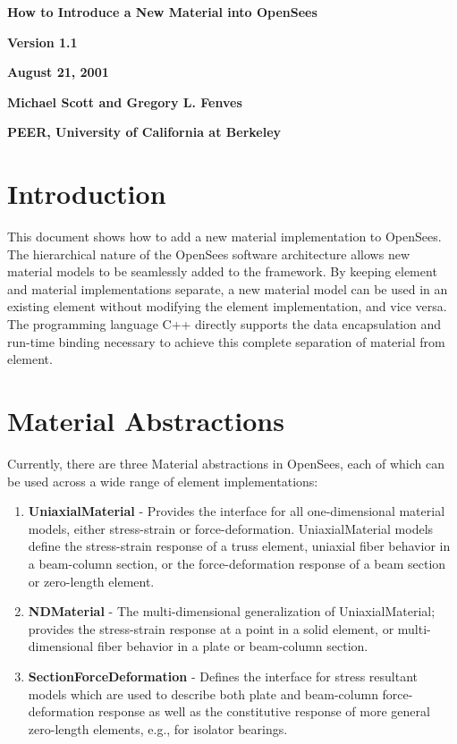 \documentclass[12pt]{article}
\begin{document}


\begin{center}
{\bf \Large How to Introduce a New Material into OpenSees}

{\bf Version 1.1} 

{\bf August 21, 2001} 

{\bf Michael Scott and Gregory L. Fenves} 

{\bf PEER, University of California at Berkeley}
\end{center}

\section{Introduction}
This document shows how to add a new material implementation to OpenSees. The hierarchical
nature of the OpenSees software architecture allows new material models
to be seamlessly added to the framework. By keeping element and material implementations
separate, a new material model can be used in an existing element without modifying
the element implementation, and vice versa. The programming language C++ directly supports
the data encapsulation and run-time binding necessary to achieve this complete separation 
of material from element.

\section{Material Abstractions}
Currently, there are three Material abstractions in OpenSees, each of which can be used 
across a wide range of element implementations:

\begin{enumerate}
\item{\bf UniaxialMaterial} - Provides the interface for all one-dimensional material
models, either stress-strain or force-deformation.
UniaxialMaterial models define the stress-strain response of a truss element, uniaxial 
fiber behavior in a
beam-column section, or the force-deformation response of a beam section or
zero-length element.

\item{\bf NDMaterial} - The multi-dimensional generalization of UniaxialMaterial;
provides the stress-strain response at a point in a solid element, or multi-dimensional
fiber behavior in a plate or beam-column section.

\item{\bf SectionForceDeformation} - Defines the interface for stress resultant models
which are used to describe both plate and beam-column force-deformation response as well as
the constitutive response of more general zero-length elements, e.g., for isolator
bearings.
\end{enumerate}
\end{document}
